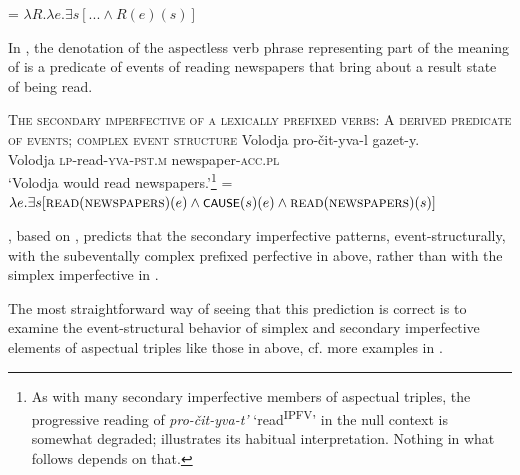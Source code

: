 \documentclass[output=paper,colorlinks,citecolor=brown]{langscibook}
\begin{document}
\ea   {} = $\lambda R.\lambda e.\exists s [... \wedge R(e)(s)]$\label{tat:ex:55}
\z

\noindent In , the denotation of the aspectless verb phrase representing part of the meaning of  is a predicate of events of reading newspapers that bring about a result state of being read.

\eanoraggedright   \textsc{The secondary imperfective of a lexically prefixed verbs: A derived predicate of events; complex event structure}\label{tat:ex:56}
\ea  \gll Volodja  pro-čit-yva-l  gazet-y.\\
     Volodja  \textsc{lp}-read-\textsc{yva-pst.m}  newspaper-\textsc{acc.pl}\\
\glt ‘Volodja would read newspapers.’\label{ex:tatevosov:56a}\footnote{As with many secondary imperfective members of aspectual triples, the progressive reading of \textit{pro-čit-yva-t’} ‘read\textsuperscript{IPFV}’ in the null context is somewhat degraded;  illustrates its habitual interpretation. Nothing in what follows depends on that.}
\ex    {} = $\lambda e.\exists s [\textsc{read}(\textsc{newspapers})(e) \wedge \cnst{cause}(s)(e) \wedge   \textsc{read}(\textsc{newspapers})(s)]$\label{ex:tatevosov:56b}
\z
\z

\noindent {}, based on , predicts that the secondary imperfective patterns, event-structurally, with the subeventally complex prefixed perfective in  above, rather than with the simplex imperfective in .

The most straightforward way of seeing that this prediction is correct is to examine the event-structural behavior of simplex and secondary imperfective elements of aspectual triples like those in  above, cf. more examples in . 
\end{document}

